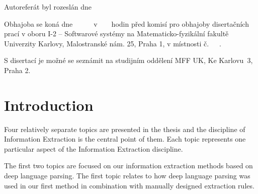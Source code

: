 \documentclass[12pt,a4paper,twoside,notitlepage]{article}
\begin{document}
\begin{tabular}{ll}
%
\end{tabular}

\vspace{4mm}

\noindent Autorefer\'{a}t byl rozesl\'{a}n dne

\noindent Obhajoba se kon\'{a} dne~\quad~\quad~\quad~\quad~\quad~v~\quad~\quad~\quad~hodin p\v{r}ed komis\'{i} pro obhajoby diserta\v{c}n\'{i}ch prac\'{i} v oboru I-2 -- Softwarov\'{e} syst\'{e}my na Matematicko-fyzik\'{a}ln\'{i} fakult\v{e} Univerzity Karlovy, Malostransk\'{e} n\'{a}m. 25, Praha 1, v m\'{i}stnosti \v{c}.~\quad~\quad~.

\noindent S disertac\'{i} je mo\v{z}n\'{e} se sezn\'{a}mit na studijn\'{i}m odd\v{e}len\'{i} MFF UK, Ke Karlovu~3, Praha 2.


\cleardoublepage

\pagestyle{plain}
\setcounter{page}{5}


\section{Introduction}

\graphicspath{{../img/ch10/}}


Four relatively separate topics are presented in the thesis and the discipline of Information Extraction is the central point of them. Each topic represents one particular aspect of the Information Extraction discipline.

The first two topics are focused on our information extraction methods based on deep language parsing. The first topic relates to how deep language parsing was used in our first method in combination with manually designed extraction rules.
\end{document}
